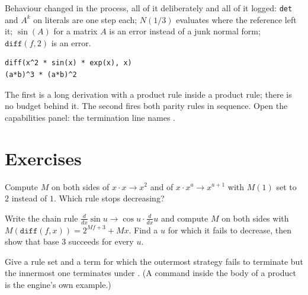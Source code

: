 Behaviour changed in the process, all of it deliberately and all of it logged: \texttt{det} and
$A^k$ on literals are one step each; $N(1/3)$ evaluates where the reference left it; $\sin(A)$ for a
matrix $A$ is an error instead of a junk normal form; $\texttt{diff}(f, 2)$ is an error.

\begin{trybox}
\begin{verbatim}
diff(x^2 * sin(x) * exp(x), x)
(a*b)^3 * (a*b)^2
\end{verbatim}
  The first is a long derivation with a product rule inside a product rule; there is no budget
  behind it. The second fires both parity rules in sequence. Open the capabilities panel: the
  termination line names .
\end{trybox}

\section{Exercises}

\begin{exercisebox}
  Compute $M$ on both sides of $x \cdot x \to x^2$ and of $x \cdot x^a \to x^{a+1}$ with $M(1)$
  set to $2$ instead of $1$. Which rule stops decreasing?
\end{exercisebox}

\begin{exercisebox}
  Write the chain rule $\frac{d}{dx} \sin u \to \cos u \cdot \frac{d}{dx} u$ and compute $M$ on
  both sides with $M(\texttt{diff}(f,x)) = 2^{M f + 3} + M x$. Find a $u$ for which it fails to
  decrease, then show that base 3 succeeds for every $u$.
\end{exercisebox}

\begin{exercisebox}
  Give a rule set and a term for which the outermost strategy fails to terminate but the
  innermost one terminates under . (A command inside the body of a product is the
  engine's own example.)
\end{exercisebox}
